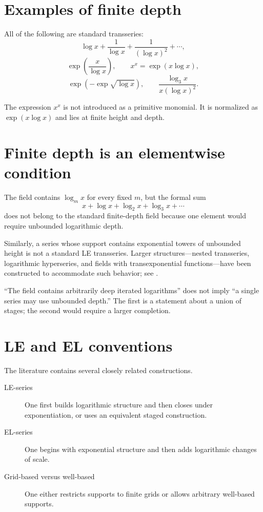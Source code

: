 \documentclass[11pt,oneside]{book}
\theoremstyle{definition}
\theoremstyle{remark}
\begin{document}
\section{Examples of finite depth}

All of the following are standard transseries:
\[
  \log x+\frac1{\log x}+\frac1{(\log x)^2}+\cdots,
\]
\[
  \exp\!\left(\frac{x}{\log x}\right),
  \qquad
  x^x=\exp(x\log x),
\]
\[
  \exp\!\left(-\exp\sqrt{\log x}\right),
  \qquad
  \frac{\log_3x}{x(\log x)^2}.
\]

The expression $x^x$ is not introduced as a primitive monomial. It is normalized
as $\exp(x\log x)$ and lies at finite height and depth.

\section{Finite depth is an elementwise condition}

The field contains $\log_mx$ for every fixed $m$, but the formal sum
\[
  x+\log x+\log_2x+\log_3x+\cdots
\]
does not belong to the standard finite-depth field because one element would
require unbounded logarithmic depth.

Similarly, a series whose support contains exponential towers of unbounded
height is not a standard LE transseries. Larger structures---nested transseries,
logarithmic hyperseries, and fields with transexponential functions---have been
constructed to accommodate such behavior; see
\cite{SchmelingThesis,vanDenDriesHoevenKaplan,PadgettTransexponential}.

\begin{warningbox}
``The field contains arbitrarily deep iterated logarithms'' does not imply ``a
single series may use unbounded depth.'' The first is a statement about a union
of stages; the second would require a larger completion.
\end{warningbox}

\section{LE and EL conventions}

The literature contains several closely related constructions.

\begin{description}
\item[LE-series]
One first builds logarithmic structure and then closes under exponentiation, or
uses an equivalent staged construction.

\item[EL-series]
One begins with exponential structure and then adds logarithmic changes of
scale.

\item[Grid-based versus well-based]
One either restricts supports to finite grids or allows arbitrary well-based
supports.
\end{description}
\end{document}
